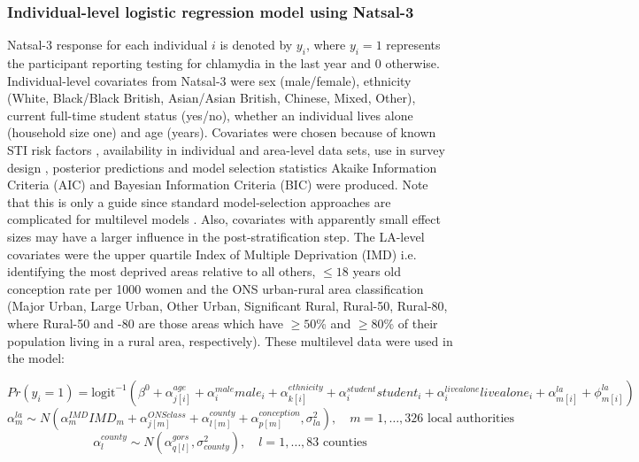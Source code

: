 \documentclass[fleqn,10pt]{wlscirep}
\begin{document}
\subsubsection*{Individual-level logistic regression model using Natsal-3}
Natsal-3 response for each individual $i$ is denoted by $y_i$, where $y_i = 1$ represents the participant reporting testing for chlamydia in the last year and 0 otherwise. 
Individual-level covariates from Natsal-3 were sex (male/female), ethnicity (White, Black/Black British, Asian/Asian British, Chinese, Mixed, Other), current full-time student status (yes/no), whether an individual lives alone (household size one) and age (years). Covariates were chosen because of known STI risk factors \cite{Waroux2014}, availability in individual and area-level data sets, use in survey design \cite{Erens2013}, posterior predictions and model selection statistics Akaike Information Criteria (AIC) and Bayesian Information Criteria (BIC) \cite{Gelman2007} were produced. Note that this is only a guide since standard model-selection approaches are complicated for multilevel models \cite{Molenberghs2016}. Also, covariates with apparently small effect sizes may have a larger influence in the post-stratification step.
The LA-level covariates were the upper quartile Index of Multiple Deprivation (IMD) i.e. identifying the most deprived areas relative to all others, $\leq 18$ years old conception rate per 1000 women and the ONS urban-rural area classification (Major Urban, Large Urban, Other Urban, Significant Rural, Rural-50, Rural-80, where Rural-50 and -80 are those areas which have $\geq 50$\% and $\geq 80$\% of their population living in a rural area, respectively). 
These multilevel data were used in the model:

\begin{displaymath}
Pr(y_i = 1) = \mbox{logit}^{-1} \left( \beta^0 + \alpha_{j[i]}^{age} + \alpha_i^{male} male_i + \alpha_{k[i]}^{ethnicity} + \alpha_i^{student} student_i + \alpha_i^{livealone} livealone_i + \alpha_{m[i]}^{la} + \phi_{m[i]}^{la} \right)
\end{displaymath}
\begin{displaymath}
\alpha_m^{la} \sim N \left( \alpha_m^{IMD} IMD_m + \alpha_{j[m]}^{ONSclass} + \alpha_{l[m]}^{county} + \alpha_{p[m]}^{conception}, \sigma_{la}^2 \right), \quad m = 1,\ldots, 326 \mbox{ local authorities}
\end{displaymath}
\begin{displaymath}
\alpha_l^{county} \sim N \left( \alpha_{q[l]}^{gors}, \sigma_{county}^2 \right), \quad l = 1, \ldots, 83 \mbox{ counties}
\end{displaymath}
\end{document}
